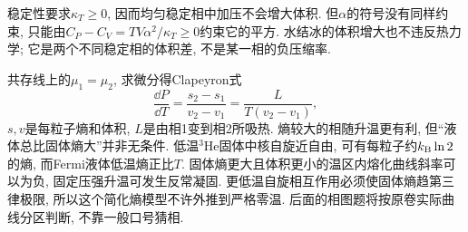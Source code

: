 稳定性要求$\kappa_T\ge0$, 因而均匀稳定相中加压不会增大体积. 但$\alpha$的符号没有同样约束, 只能由$C_P-C_V=TV\alpha^2/\kappa_T\ge0$约束它的平方. 水结冰的体积增大也不违反热力学; 它是两个不同稳定相的体积差, 不是某一相的负压缩率.

共存线上的$\mu_1=\mu_2$, 求微分得Clapeyron式
\[
\frac{\dd P}{\dd T}=\frac{s_2-s_1}{v_2-v_1}=\frac{L}{T(v_2-v_1)},
\]
$s,v$是每粒子熵和体积, $L$是由相1变到相2所吸热. 熵较大的相随升温更有利, 但“液体总比固体熵大”并非无条件. 低温${}^3$He固体中核自旋近自由, 可有每粒子约$k_{\mathrm B}\ln2$的熵, 而Fermi液体低温熵正比$T$. 固体熵更大且体积更小的温区内熔化曲线斜率可以为负, 固定压强升温可发生反常凝固. 更低温自旋相互作用必须使固体熵趋第三律极限, 所以这个简化熵模型不许外推到严格零温. 后面的相图题将按原卷实际曲线分区判断, 不靠一般口号猜相.
